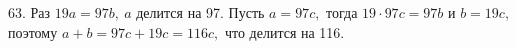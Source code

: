 63. Раз $19a=97b,\ a$ делится на 97. Пусть $a=97c,$ тогда $19\cdot97c=97b$ и $b=19c,$ поэтому $a+b=97c+19c=116c,$ что делится на 116.\\
